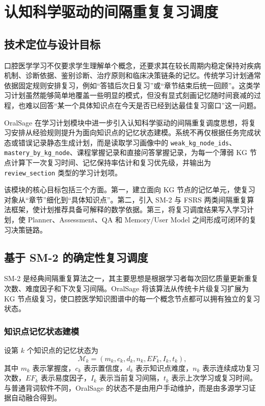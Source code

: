 
\chapter{认知科学驱动的间隔重复复习调度}
\label{sec:spaced-repetition-scheduling}

\section{技术定位与设计目标}

口腔医学学习不仅要求学生理解单个概念，还要求其在较长周期内稳定保持对疾病机制、诊断依据、鉴别诊断、治疗原则和临床决策链条的记忆。传统学习计划通常依据固定规则安排复习，例如“答错后次日复习”或“章节结束后统一回顾”。这类学习计划虽然能够简单地覆盖一些明显的模式，但没有显式刻画记忆随时间衰减的过程，也难以回答“某一个具体知识点在今天是否已经到达最佳复习窗口”这一问题。

OralSage 在学习计划模块中进一步引入认知科学驱动的间隔重复调度思想，将复习安排从经验规则提升为面向知识点的记忆状态建模。系统不再仅根据任务完成状态或错误记录静态生成计划，而是读取学习画像中的 \texttt{weak\_kg\_node\_ids}、\texttt{mastery\_by\_kg\_node}、课程掌握记录和直接问答掌握记录，为每一个薄弱 KG 节点计算下一次复习时间、记忆保持率估计和复习优先级，并输出为 \texttt{review\_section} 类型的学习计划项。

该模块的核心目标包括三个方面。第一，建立面向 KG 节点的记忆单元，使复习对象从“章节”细化到“具体知识点”。第二，引入 SM-2 与 FSRS 两类间隔重复算法框架，使计划推荐具备可解释的数学依据。第三，将复习调度结果写入学习计划，使 Planner、Assessment、QA 和 Memory/User Model 之间形成可闭环的复习决策链路。

\section{基于 SM-2 的确定性复习调度}

SM-2 是经典间隔重复算法之一，其主要思想是根据学习者每次回忆质量更新重复次数、难度因子和下次复习间隔\cite{wozniak1990sm2}。OralSage 将该算法从传统卡片级复习扩展为 KG 节点级复习，使口腔医学知识图谱中的每一个概念节点都可以拥有独立的复习状态。

\subsection{知识点记忆状态建模}

设第 $k$ 个知识点的记忆状态为
\begin{equation}
  \mathcal{M}_k=(m_k,c_k,d_k,n_k,EF_k,I_k,t_k),
\end{equation}
其中 $m_k$ 表示掌握度，$c_k$ 表示置信度，$d_k$ 表示知识点难度，$n_k$ 表示连续成功复习次数，$EF_k$ 表示易度因子，$I_k$ 表示当前复习间隔，$t_k$ 表示上次学习或复习时间。与普通背词软件不同，OralSage 的状态不是由用户手动维护，而是由多源学习证据自动融合得到。

